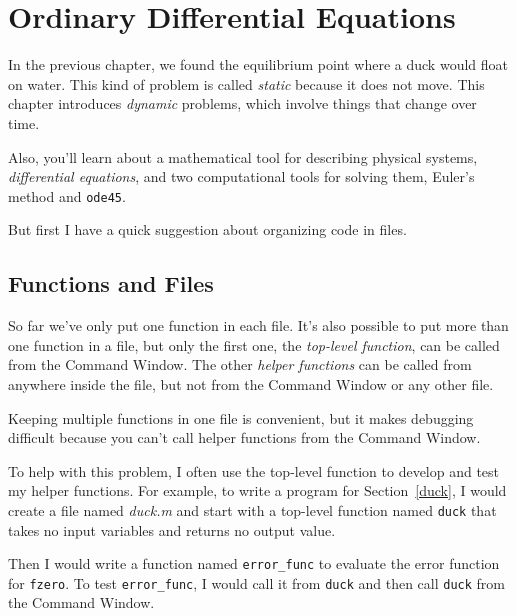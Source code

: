 \chapter{Ordinary Differential Equations}


In the previous chapter, we found the equilibrium point where a duck would float on water.  This kind of problem is called \emph{static} because it does not move.  This chapter introduces \emph{dynamic} problems, which involve things that change over time.
 
Also, you'll learn about a mathematical tool for describing physical systems, \emph{differential equations}, and two computational tools for solving them, Euler's method and \lstinline{ode45}.

But first I have a quick suggestion about organizing code in files.

\section{Functions and Files}
\label{funfiles}

So far we've only put one function in each file.  It's also possible
to put more than one function in a file, but only the first one, the
\emph{top-level function}, can be called from the Command
Window.  The other \emph{helper functions} can be called from anywhere inside the file, but not from the Command Window or any other file.


Keeping multiple functions in one file is convenient, but it makes \linebreak debugging
difficult because you can't call helper functions from the Command
Window.

To help with this problem, I often use the top-level function
to develop and test my helper functions.  For example, to write
a program for Section~\ref{duck}, I would create a file named
\emph{duck.m} and start with a top-level function named \lstinline{duck}
that takes no input variables and returns no output value.

Then I would write a function named \lstinline{error_func} to
evaluate the error function for \lstinline{fzero}.  To test
\lstinline{error_func}, I would call it from \lstinline{duck} and then
call \lstinline{duck} from the Command Window.



